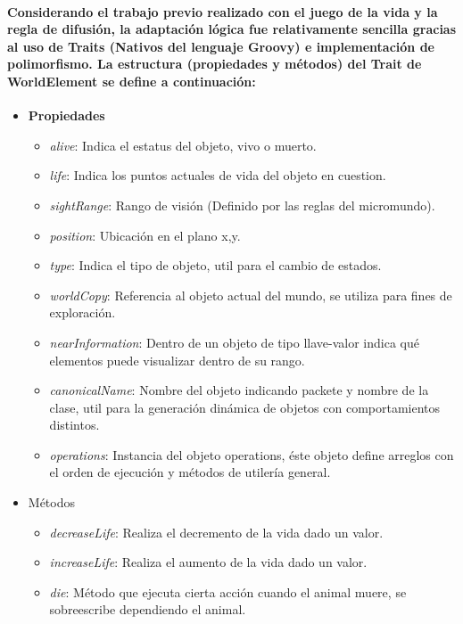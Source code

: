     \paragraph{Considerando el trabajo previo realizado con el juego de la vida y la regla de difusión, la adaptación lógica fue relativamente sencilla gracias al uso de Traits (Nativos del lenguaje Groovy) e implementación de polimorfismo. La estructura (propiedades y métodos) del Trait de WorldElement  se define a continuación:}
    \begin{itemize}
        \item{\textbf{Propiedades}}
          \begin{itemize}
            \item{\textit{alive}: Indica el estatus del objeto, vivo o muerto.}            
            \item{\textit{life}: Indica los puntos actuales de vida del objeto en cuestion.}
            \item{\textit{sightRange}: Rango de visión (Definido por las reglas del micromundo).}
            \item{\textit{position}: Ubicación en el plano x,y.}
            \item{\textit{type}: Indica el tipo de objeto, util para el cambio de estados.}
            \item{\textit{worldCopy}: Referencia al objeto actual del mundo, se utiliza para fines de exploración.}
            \item{\textit{nearInformation}: Dentro de un objeto de tipo llave-valor indica qué elementos puede visualizar dentro de su rango.}
            \item{\textit{canonicalName}: Nombre del objeto indicando packete y nombre de la clase, util para la generación dinámica de objetos con comportamientos distintos.}
            \item{\textit{operations}: Instancia del objeto operations, éste objeto define arreglos con el orden de ejecución y métodos de utilería general.}
          \end{itemize}
        \item{Métodos}
          \begin{itemize}            
            \item{\textit{decreaseLife}: Realiza el decremento de la vida dado un valor.}
            \item{\textit{increaseLife}: Realiza el aumento de la vida dado un valor.}
            \item{\textit{die}: Método que ejecuta cierta acción cuando el animal muere, se sobreescribe dependiendo el animal.}

\end{itemize}
\end{itemize}
